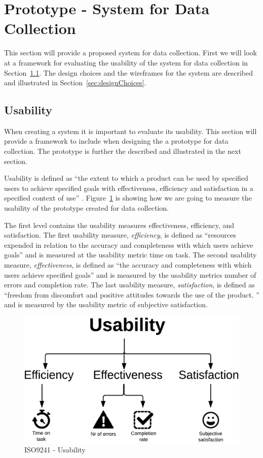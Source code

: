 \section{Prototype - System for Data Collection}
\label{sec:wireframes}

  This section will provide a proposed system for data collection. First we will look at a framework for evaluating the usability of the system for data collection in Section~\ref{sec:usability}. The design choices and the wireframes for the system are described and illustrated in Section~\ref{sec:designChoices}.

  \subsection{Usability} \label{sec:usability}

  When creating a system it is important to evaluate its usability. This section will provide a framework to include when designing the a prototype for data collection. The prototype is further the described and illustrated in the next section.

  Usability is defined as ``the extent to which a product can be used by specified users to achieve specified goals with effectiveness, efficiency and satisfaction in a specified context of use'' \cite{ISO9241}. Figure~\ref{fig:usability} is showing how we are going to measure the usability of the prototype created for data collection.

  The first level contains the usability measures effectiveness, efficiency, and satisfaction. The first usability measure, {\it efficiency}, is defined as ``resources expended in relation to the accuracy and completeness with which users achieve goals'' and is measured at the usability metric time on task. The second usability measure, {\it effectiveness}, is defined as ``the accuracy and completeness with which users achieve specified goals'' and is measured by the usability metrics number of errors and completion rate. The last usability measure, {\it satisfaction}, is defined as ``freedom from discomfort and positive attitudes towards the use of the product. '' and is measured by the usability metric of subjective satisfaction.

  \begin{figure}[H]
    \centering
    \includegraphics[scale=0.25]{pics/usability.png}
    \caption[ISO9241 - Usability]{ISO9241 - Usability \cite{ISO9241}}
    \label{fig:usability}
  \end{figure}


